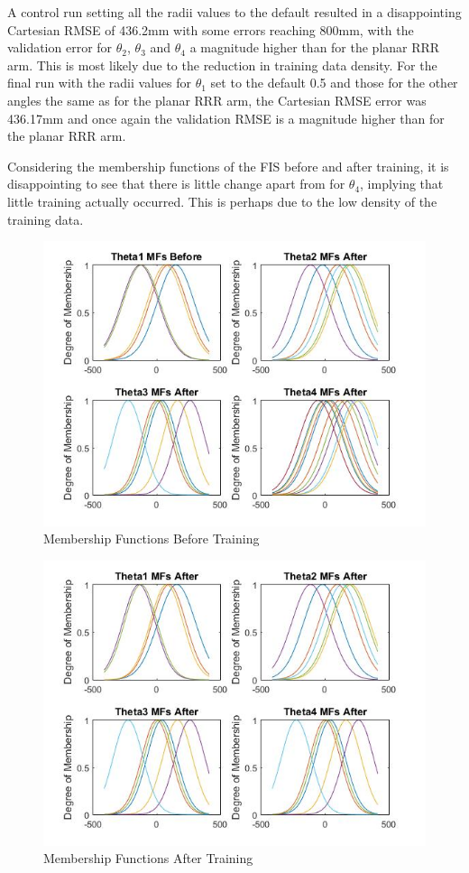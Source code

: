 \documentclass[11.5pt, twoside, a4paper]{article}
\begin{document}
A control run setting all the radii values to the default resulted in a disappointing Cartesian RMSE of 436.2mm with some errors reaching 800mm, with the validation error for $\theta_2$, $\theta_3$ and $\theta_4$ a magnitude higher than for the planar RRR arm. This is most likely due to the reduction in training data density. For the final run with the radii values for $\theta_1$ set to the default 0.5 and those for the other angles the same as for the planar RRR arm, the Cartesian RMSE error was 436.17mm and once again the validation RMSE is a magnitude higher than for the planar RRR arm.

Considering the membership functions of the FIS before and after training, it is disappointing to see that there is little change apart from for $\theta_4$, implying that little training actually occurred. This is perhaps due to the low density of the training data.
\begin{figure}
\includegraphics[width=\linewidth]{MFsBefore.jpg}
\caption{Membership Functions Before Training \label{fig:MFsBefore}}
\end{figure}

\begin{figure}
\includegraphics[width=\linewidth]{MFsAfter.jpg}
\caption{Membership Functions After Training \label{fig:MFsAfter}}
\end{figure}
\end{document}
